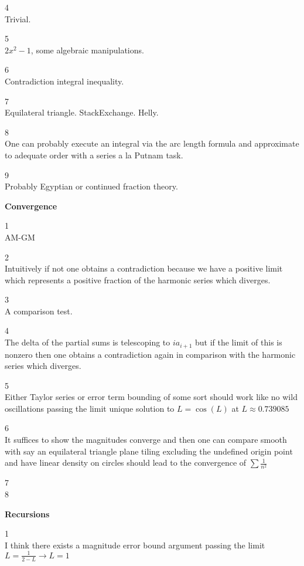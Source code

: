 4 \\
Trivial.

5 \\
$2x^2-1$, some algebraic manipulations.

6 \\
Contradiction integral inequality.

7 \\
Equilateral triangle. StackExchange. Helly.

8 \\
One can probably execute an integral via the arc length formula and approximate to adequate order with a series a la Putnam task.

9 \\
Probably Egyptian or continued fraction theory.

\newpage

\textbf{Convergence}

1 \\
AM-GM

2 \\
Intuitively if not one obtains a contradiction because we have a positive limit which represents a positive fraction of the harmonic series which diverges.

3 \\
A comparison test.

4 \\
The delta of the partial sums is telescoping to $ia_{i+1}$ but if the limit of this is nonzero then one obtains a contradiction again in comparison with the harmonic series which diverges.

5 \\
Either Taylor series or error term bounding of some sort should work like no wild oscillations passing the limit unique solution to $L=\cos(L)$ at $L \approx 0.739085$

6 \\
It suffices to show the magnitudes converge and then one can compare smooth with say an equilateral triangle plane tiling excluding the undefined origin point and have linear density on circles should lead to the convergence of $\sum \frac{1}{n^2}$

7 \\


8 \\


\newpage

\textbf{Recursions}

1 \\
I think there exists a magnitude error bound argument passing the limit $L=\frac{1}{2-L} \to L=1$

